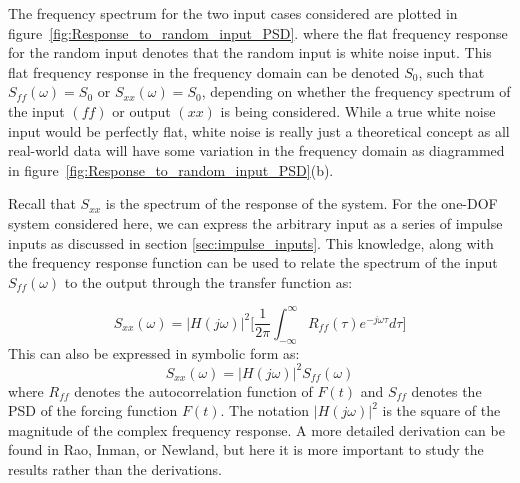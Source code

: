 \documentclass[12pt,letter]{article}
\begin{document}
The frequency spectrum for the two input cases considered are plotted in figure~\ref{fig:Response_to_random_input_PSD}. where the flat frequency response for the random input denotes that the random input is white noise input.  This flat frequency response in the frequency domain can be denoted $S_0$, such that $S_{ff}(\omega) = S_0$ or $S_{xx}(\omega) = S_0$, depending on whether the frequency spectrum of the input $(ff)$ or output  $(xx)$ is being considered. While a true white noise input would be perfectly flat, white noise is really just a theoretical concept as all real-world data will have some variation in the frequency domain as diagrammed in figure~\ref{fig:Response_to_random_input_PSD}(b). 


Recall that $S_{xx}$ is the spectrum of the response of the system. For the one-DOF system considered here, we can express the arbitrary input as a series of impulse inputs as discussed in section \ref{sec:impulse_inputs}. This knowledge, along with the frequency response function can be used to relate the spectrum of the input $S_{ff}(\omega)$ to the output through the transfer function as: 







\begin{equation}
S_{xx}(\omega) =  |H(j\omega)|^2\Bigg[\frac{1}{2 \pi } \int_{-\infty}^{\infty} R_{ff}(\tau) e^{-j \omega \tau}d  \tau  \Bigg] 
\end{equation}
This can also be expressed in symbolic form as:
\begin{equation}
S_{xx}(\omega) =  |H(j\omega)|^2 S_{ff}(\omega)
\end{equation}
where $R_{ff}$ denotes the autocorrelation function of $F(t)$ and $S_{ff}$ denotes the PSD of the forcing function $F(t)$. The notation $|H(j\omega)|^2$ is the square of the magnitude of the complex frequency response. A more detailed derivation can be found in Rao\protect\footnotemark[1], Inman\protect\footnotemark[2], or Newland\protect\footnotemark[3], but here it is more important to study the results rather than the derivations.
\end{document}
